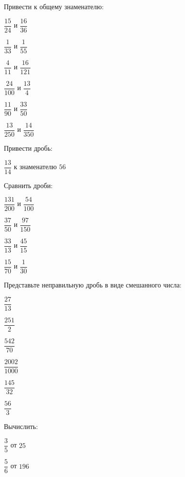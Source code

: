 \begin{listofex}
	\item Привести к общему знаменателю:
	\begin{enumcols}[itemcolumns=6]
		\item \( \dfrac{15}{24} \) и \( \dfrac{16}{36} \)
		\item \( \dfrac{1}{33} \) и \( \dfrac{1}{55} \)
		\item \( \dfrac{4}{11} \) и \( \dfrac{16}{121} \)
		\item \( \dfrac{24}{100} \) и \( \dfrac{13}{4} \)
		\item \( \dfrac{11}{90} \) и \( \dfrac{33}{50} \)
		\item \( \dfrac{13}{250} \) и \( \dfrac{14}{350} \)
	\end{enumcols}
	\item Привести дробь:
	\begin{enumcols}[itemcolumns=2]
		\item \( \dfrac{13}{14} \) к знаменателю \( 56 \)
	\end{enumcols}
	\item Сравнить дроби:
	\begin{enumcols}[itemcolumns=4]
		\item \( \dfrac{131}{200} \) и \( \dfrac{54}{100} \)
		\item \( \dfrac{37}{50} \) и \( \dfrac{97}{150} \)
		\item \( \dfrac{33}{13} \) и \( \dfrac{45}{15} \)
		\item \( \dfrac{15}{70} \) и \( \dfrac{1}{30} \)
	\end{enumcols}
	\item Представьте неправильную дробь в виде смешанного числа:
	\begin{enumcols}[itemcolumns=6]
		\item \( \dfrac{27}{13} \)
		\item \( \dfrac{251}{2} \)
		\item \( \dfrac{542}{70} \)
		\item \( \dfrac{2002}{1000} \)
		\item \( \dfrac{145}{32} \)
		\item \( \dfrac{56}{3} \)
	\end{enumcols}
	\item Вычислить:
	\begin{enumcols}[itemcolumns=2]
		\item \( \dfrac{3}{5} \) от \( 25 \)
		\item \( \dfrac{5}{6} \) от \( 196 \)

\end{enumcols}
\end{listofex}
